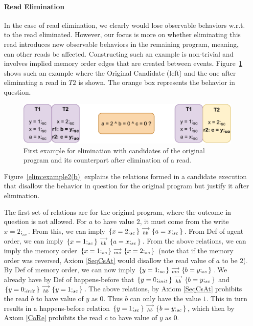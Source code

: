     \paragraph{Read Elimination}
    
        In the case of read elimination, we clearly would lose observable behaviors w.r.t. to the read eliminated.
        However, our focus is more on whether eliminating this read introduces new observable behaviors in the remaining program, meaning, can other reads be affected.
        Constructing such an example is non-trivial and involves implied memory order edges that are created between events.
        Figure~\ref{elim:example2(a)} shows such an example where the Original Candidate (left) and the one after eliminating a read in $T2$ is shown.
        The orange box represents the behavior in question. 
        \begin{figure}[H]
            \centering
            \includegraphics[scale=0.7]{5.Elimination/EliminationExample2(a).pdf}
            \caption{First example for elimination with candidates of the original program and its counterpart after elimination of a read.} 
            \label{elim:example2(a)}
        \end{figure}

        Figure~\ref{elim:example2(b)} explains the relations formed in a candidate execution that disallow the behavior in question for the original program but justify it after elimination. 

        The first set of relations are for the original program, where the outcome in question is not allowed.
        For $a$ to have value $2$, it must come from the write $x=2;_{sc}$.
        From this, we can imply $\{x=2;_{sc}\}\stackrel{\longrightarrow}{_{hb}}\{a=x;_{sc}\}$.
        From Def of agent order, we can imply $\{x=1;_{sc}\}\stackrel{\longrightarrow}{_{hb}}\{a=x;_{sc}\}$.
        From the above relations, we can imply the memory order $\{x=1;_{sc}\}\stackrel{\longrightarrow}{_{mo}}\{x=2;_{sc}\}$ (note that if the memory order was reversed, Axiom \ref{SeqCsAt} would disallow the read value of $a$ to be $2$).
        By Def of memory order, we can now imply $\{y=1;_{sc}\}\stackrel{\longrightarrow}{_{mo}}\{b=y;_{sc}\}$.
        We already have by Def of happens-before that $\{y=0;_{init}\}\stackrel{\longrightarrow}{_{hb}}\{b=y;_{sc}\}$ and $\{y=0;_{init}\}\stackrel{\longrightarrow}{_{hb}}\{y=1;_{sc}\}$.
        The above relations, by Axiom \ref{SeqCsAt} prohibits the read $b$ to have value of $y$ as $0$.
        Thus $b$ can only have the value $1$.
        This in turn results in a happens-before relation $\{y=1;_{sc}\}\stackrel{\longrightarrow}{_{hb}}\{b=y;_{sc}\}$, which then by Axiom \ref{CoRe} prohibits the read $c$ to have value of $y$ as $0$.
            
